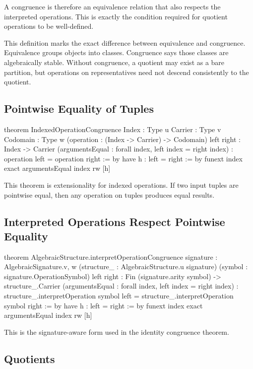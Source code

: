 \documentclass[11pt]{article}
\begin{document}
A congruence is therefore an equivalence relation that also respects the interpreted operations. This is exactly the condition required for quotient operations to be well-defined.

This definition marks the exact difference between equivalence and congruence. Equivalence groups objects into classes. Congruence says those classes are algebraically stable. Without congruence, a quotient may exist as a bare partition, but operations on representatives need not descend consistently to the quotient.

\subsection{Pointwise Equality of Tuples}

\begin{leanblock}
theorem IndexedOperationCongruence
    {Index : Type u} {Carrier : Type v} {Codomain : Type w}
    (operation : (Index -> Carrier) -> Codomain)
    {left right : Index -> Carrier}
    (argumentsEqual : forall index, left index = right index) :
    operation left = operation right := by
  have h : left = right := by
    funext index
    exact argumentsEqual index
  rw [h]
\end{leanblock}

This theorem is extensionality for indexed operations. If two input tuples are pointwise equal, then any operation on tuples produces equal results.

\subsection{Interpreted Operations Respect Pointwise Equality}

\begin{leanblock}
theorem AlgebraicStructure.interpretOperationCongruence
    {signature : AlgebraicSignature.{v, w}}
    (structure_ : AlgebraicStructure.{u} signature)
    (symbol : signature.OperationSymbol)
    {left right : Fin (signature.arity symbol) -> structure_.Carrier}
    (argumentsEqual : forall index, left index = right index) :
    structure_.interpretOperation symbol left =
      structure_.interpretOperation symbol right := by
  have h : left = right := by
    funext index
    exact argumentsEqual index
  rw [h]
\end{leanblock}

This is the signature-aware form used in the identity congruence theorem.

\subsection{Quotients}
\end{document}
